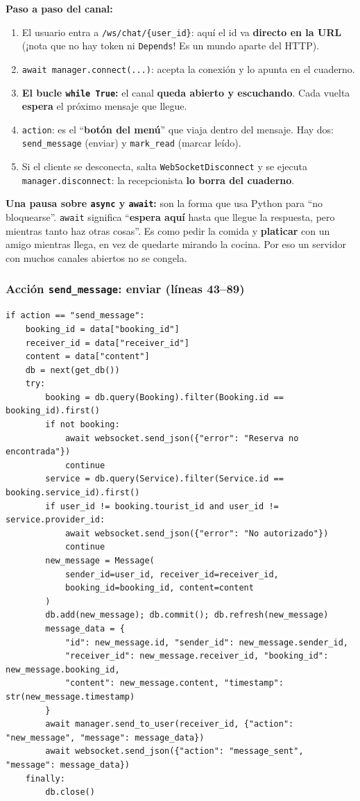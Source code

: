 \documentclass[11pt,a4paper]{article}
\begin{document}
\textbf{Paso a paso del canal:}
\begin{enumerate}
    \item El usuario entra a \texttt{/ws/chat/\{user\_id\}}: aquí el id va \textbf{directo en la
    URL} (¡nota que no hay token ni \texttt{Depends}! Es un mundo aparte del HTTP).
    \item \texttt{await manager.connect(...)}: acepta la conexión y lo apunta en el cuaderno.
    \item \textbf{El bucle \texttt{while True}:} el canal \textbf{queda abierto y escuchando}.
    Cada vuelta \textbf{espera} el próximo mensaje que llegue.
    \item \texttt{action}: es el ``\textbf{botón del menú}'' que viaja dentro del mensaje. Hay dos:
    \texttt{send\_message} (enviar) y \texttt{mark\_read} (marcar leído).
    \item Si el cliente se desconecta, salta \texttt{WebSocketDisconnect} y se ejecuta
    \texttt{manager.disconnect}: la recepcionista \textbf{lo borra del cuaderno}.
\end{enumerate}

\textbf{Una pausa sobre \texttt{async} y \texttt{await}:} son la forma que usa Python para
``no bloquearse''. \texttt{await} significa ``\textbf{espera aquí} hasta que llegue la
respuesta, pero mientras tanto haz otras cosas''. Es como pedir la comida y \textbf{platicar}
con un amigo mientras llega, en vez de quedarte mirando la cocina. Por eso un servidor con
muchos canales abiertos no se congela.

\subsubsection{Acción \texttt{send\_message}: enviar (líneas 43--89)}

\begin{lstlisting}
if action == "send_message":
    booking_id = data["booking_id"]
    receiver_id = data["receiver_id"]
    content = data["content"]
    db = next(get_db())
    try:
        booking = db.query(Booking).filter(Booking.id == booking_id).first()
        if not booking:
            await websocket.send_json({"error": "Reserva no encontrada"})
            continue
        service = db.query(Service).filter(Service.id == booking.service_id).first()
        if user_id != booking.tourist_id and user_id != service.provider_id:
            await websocket.send_json({"error": "No autorizado"})
            continue
        new_message = Message(
            sender_id=user_id, receiver_id=receiver_id,
            booking_id=booking_id, content=content
        )
        db.add(new_message); db.commit(); db.refresh(new_message)
        message_data = {
            "id": new_message.id, "sender_id": new_message.sender_id,
            "receiver_id": new_message.receiver_id, "booking_id": new_message.booking_id,
            "content": new_message.content, "timestamp": str(new_message.timestamp)
        }
        await manager.send_to_user(receiver_id, {"action": "new_message", "message": message_data})
        await websocket.send_json({"action": "message_sent", "message": message_data})
    finally:
        db.close()
\end{lstlisting}
\end{document}
